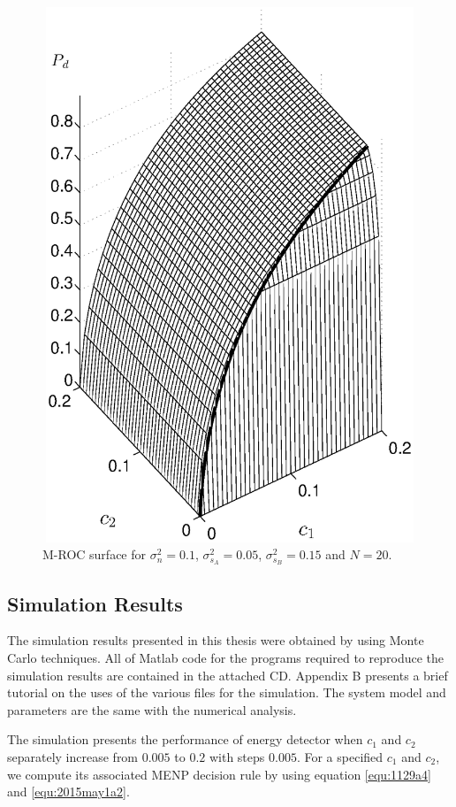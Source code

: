 \begin{figure}[!t]
\centering
\includegraphics[width=12cm, height=16cm]{4/mathc1c2pd.eps}
\caption{M-ROC surface for $\sigma_n^2 = 0.1$, $\sigma_{s_A}^2=0.05$, $\sigma_{s_B}^2=0.15$ and $N = 20$.}
\label{pic:1201a1}
\end{figure}

\subsection{Simulation Results}
The simulation results presented in this thesis were obtained by using Monte Carlo techniques. All of Matlab code for the programs required to reproduce the simulation results are contained in the attached CD. Appendix B presents a brief tutorial on the uses of the various files for the simulation. The system model and parameters are the same with the numerical analysis.

The simulation presents the performance of energy detector when $c_1$ and $c_2$ separately increase from $0.005$ to $0.2$ with steps $0.005$. For a specified $c_1$ and $c_2$, we compute its associated MENP decision rule by using  equation \eqref{equ:1129a4} and \eqref{equ:2015may1a2}. 

